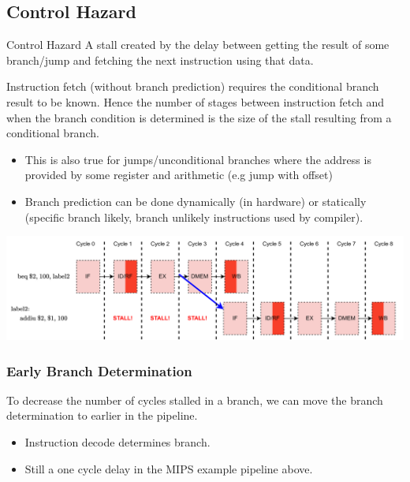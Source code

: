 \subsection{Control Hazard}
\begin{definitionbox}{Control Hazard}
    A stall created by the delay between getting the result of some branch/jump and fetching the next instruction using that data.
\end{definitionbox}
Instruction fetch (without branch prediction) requires the conditional branch result to be known. Hence the number of stages between instruction fetch and when the branch condition is determined is the size of the stall resulting from a conditional branch.
\begin{itemize}
    \item This is also true for jumps/unconditional branches where the address is provided by some register and arithmetic (e.g jump with offset)
    \item Branch prediction can be done dynamically (in hardware) or statically (specific branch likely, branch unlikely instructions used by compiler).
\end{itemize}
\begin{center}
    \includegraphics[width=.9\textwidth]{pipelining/images/control_hazard_conditional_branch.drawio.png}
\end{center}

\subsubsection{Early Branch Determination}
To decrease the number of cycles stalled in a branch, we can move the branch determination to earlier in the pipeline.
\begin{itemize}
    \item Instruction decode determines branch.
    \item Still a one cycle delay in the MIPS example pipeline above.
\end{itemize}

